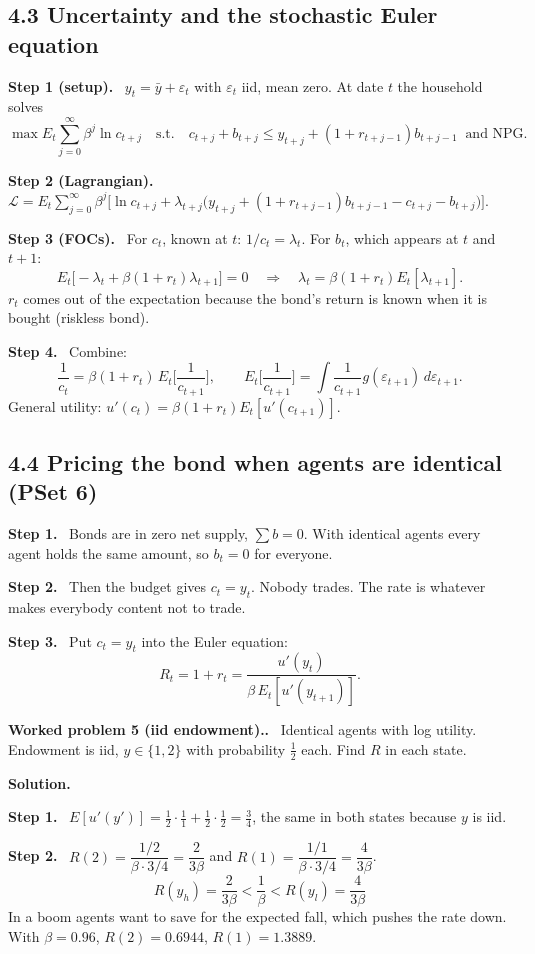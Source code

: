 \documentclass[12pt]{article}
\newcommand{\st}[1]{\par\smallskip\textbf{Step #1.}\ }
\newcommand{\ans}[1]{\[\boxed{\ #1\ }\]}
\newcommand{\prob}[1]{\par\bigskip\textbf{Worked problem #1.}\ }
\newcommand{\sol}{\par\smallskip\textbf{Solution.}\par}
\begin{document}
\subsection*{4.3 Uncertainty and the stochastic Euler equation}
\st{1 (setup)} $y_t=\bar y+\varepsilon_t$ with $\varepsilon_t$ iid, mean zero. At date $t$ the household solves
\[
\max E_t\sum_{j=0}^\infty\beta^j\ln c_{t+j}\quad\text{s.t.}\quad c_{t+j}+b_{t+j}\le y_{t+j}+(1+r_{t+j-1})b_{t+j-1}\ \text{ and NPG.}
\]
\st{2 (Lagrangian)}
$\mathcal L=E_t\sum_{j=0}^\infty\beta^j\big[\ln c_{t+j}+\lambda_{t+j}\big(y_{t+j}+(1+r_{t+j-1})b_{t+j-1}-c_{t+j}-b_{t+j}\big)\big]$.
\st{3 (FOCs)} For $c_t$, known at $t$: $1/c_t=\lambda_t$. For $b_t$, which appears at $t$ and $t+1$:
\[
E_t\big[-\lambda_t+\beta(1+r_t)\lambda_{t+1}\big]=0\quad\Longrightarrow\quad\lambda_t=\beta(1+r_t)E_t[\lambda_{t+1}] .
\]
$r_t$ comes out of the expectation because the bond's return is known when it is bought (riskless bond).
\st{4} Combine:
\ans{\frac{1}{c_t}=\beta(1+r_t)\,E_t\Big[\frac{1}{c_{t+1}}\Big],\qquad E_t\Big[\frac{1}{c_{t+1}}\Big]=\int\frac{1}{c_{t+1}}g(\varepsilon_{t+1})\,d\varepsilon_{t+1}.}
General utility: $u'(c_t)=\beta(1+r_t)E_t[u'(c_{t+1})]$.

\subsection*{4.4 Pricing the bond when agents are identical (PSet 6)}
\st{1} Bonds are in zero net supply, $\sum b=0$. With identical agents every
agent holds the same amount, so $b_t=0$ for everyone.
\st{2} Then the budget gives $c_t=y_t$. Nobody trades. The rate is whatever
makes everybody content not to trade.
\st{3} Put $c_t=y_t$ into the Euler equation:
\ans{R_t=1+r_t=\frac{u'(y_t)}{\beta\,E_t[u'(y_{t+1})]} .}

\prob{5 (iid endowment).} Identical agents with log utility. Endowment is iid,
$y\in\{1,2\}$ with probability $\tfrac12$ each. Find $R$ in each state.
\sol
\st{1} $E[u'(y')]=\tfrac12\cdot\frac11+\tfrac12\cdot\frac12=\tfrac34$, the same in both states because $y$ is iid.
\st{2} $R(2)=\dfrac{1/2}{\beta\cdot3/4}=\dfrac{2}{3\beta}$ and $R(1)=\dfrac{1/1}{\beta\cdot3/4}=\dfrac{4}{3\beta}$.
\ans{R(y_h)=\frac{2}{3\beta}<\frac1\beta<R(y_l)=\frac{4}{3\beta}}
In a boom agents want to save for the expected fall, which pushes the rate down.
With $\beta=0.96$, $R(2)=0.6944$, $R(1)=1.3889$.
\end{document}
